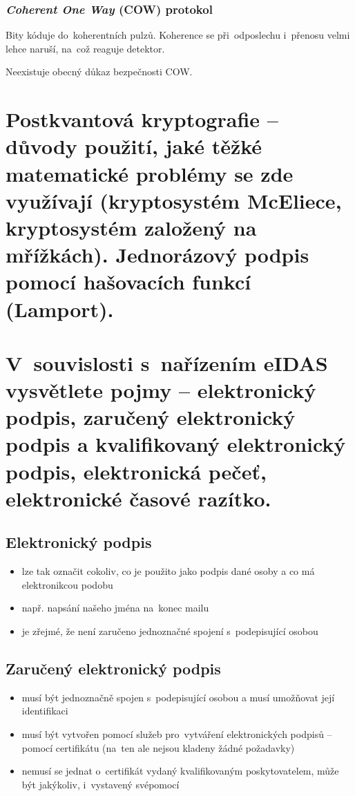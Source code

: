 \subsubsection*{\emph{Coherent One Way} (COW) protokol}

Bity kóduje do~koherentních pulzů.
Koherence se při~odposlechu i~přenosu velmi lehce naruší, na~což reaguje detektor.

Neexistuje obecný důkaz bezpečnosti COW.


\clearpage
\section{Postkvantová kryptografie -- důvody použití, jaké těžké matematické problémy se zde využívají (kryptosystém McEliece, kryptosystém založený na mřížkách). Jednorázový podpis pomocí hašovacích funkcí (Lamport).}




\clearpage
\section{V~souvislosti s~nařízením eIDAS vysvětlete pojmy -- elektronický podpis, zaručený elektronický podpis a kvalifikovaný elektronický podpis, elektronická pečeť, elektronické časové razítko.}
\subsection{Elektronický podpis}
\begin{itemize}
    \item lze tak označit cokoliv, co je použito jako podpis dané osoby a co má elektronikcou podobu
    \item např. napsání našeho jména na~konec mailu
    \item je zřejmé, že není zaručeno jednoznačné spojení s~podepisující osobou
\end{itemize}

\subsection{Zaručený elektronický podpis}
\begin{itemize}
    \item musí být jednoznačně spojen s~podepisující osobou a musí umožňovat její identifikaci
    \item musí být vytvořen pomocí služeb pro~vytváření elektronických podpisů -- pomocí certifikátu (na~ten ale nejsou kladeny žádné požadavky)
    \item nemusí se jednat o~certifikát vydaný kvalifikovaným poskytovatelem, může být jakýkoliv, i~vystavený svépomocí
\end{itemize}

